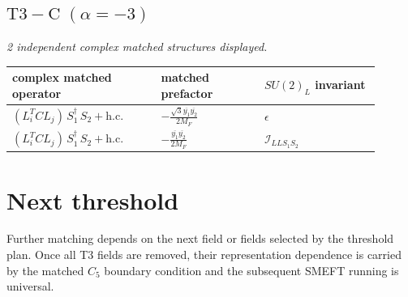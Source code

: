 \documentclass[9pt]{article}
\begin{document}
\subsection*{$ \mathrm{T3-C}\;(\alpha=-3) $}
\textit{2 independent complex matched structures displayed. }
\begin{longtable}{@{}p{0.36\linewidth}p{0.25\linewidth}p{0.29\linewidth}@{}}
\toprule
complex matched operator & matched prefactor & $SU(2)_L$ invariant \\
\midrule
$ (L_i^T C L_j)\,S_1^\dagger\,S_2+\mathrm{h.c.} $ & $ - \frac{\sqrt{3} \overline{y_{1}} \overline{y_{2}}}{2 M_F} $ & $ \epsilon $ \\
$ (L_i^T C L_j)\,S_1^\dagger\,S_2+\mathrm{h.c.} $ & $ - \frac{\overline{y_{1}} \overline{y_{2}}}{2 M_F} $ & $ \mathcal{I}_{LLS_1S_2} $ \\
\bottomrule
\end{longtable}
\section*{Next threshold}
Further matching depends on the next field or fields selected by the threshold plan.  Once all T3 fields are removed, their representation dependence is carried by the matched $C_5$ boundary condition and the subsequent SMEFT running is universal.
\end{document}
